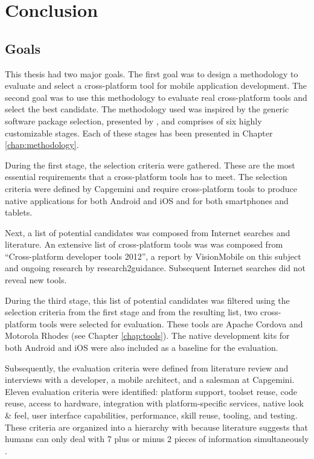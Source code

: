 \chapter{Conclusion}
\label{chap:conclusion}

\section{Goals}
\label{sec:goals}

This thesis had two major goals. The first goal was to design a methodology to evaluate and select a cross-platform tool for mobile application development. The second goal was to use this methodology to evaluate real cross-platform tools and select the best candidate. The methodology used was inspired by the generic software package selection, presented by \citet{Jadhav:2011}, and comprises of six highly customizable stages. Each of these stages has been presented in Chapter \ref{chap:methodology}. 

During the first stage, the selection criteria were gathered. These are the most essential requirements that a cross-platform tools has to meet. The selection criteria were defined by Capgemini and require cross-platform tools to produce native applications for both Android and iOS and for both smartphones and tablets. 

Next, a list of potential candidates was composed from Internet searches and literature. An extensive list of cross-platform tools was was composed from ``Cross-platform developer tools 2012'', a report by VisionMobile on this subject \cite{VMCPT:2012} and ongoing research by research2guidance. Subsequent Internet searches did not reveal new tools.

During the third stage, this list of potential candidates was filtered using the selection criteria from the first stage and from the resulting list, two cross-platform tools were selected for evaluation. These tools are Apache Cordova and Motorola Rhodes (see Chapter \ref{chap:tools}). The native development kits for both Android and iOS were also included as a baseline for the evaluation. 

Subsequently, the evaluation criteria were defined from literature review and interviews with a developer, a mobile architect, and a salesman at Capgemini. Eleven evaluation criteria were identified: platform support, toolset reuse, code reuse, access to hardware, integration with platform-specific services, native look \& feel, user interface capabilities, performance, skill reuse, tooling, and testing. These criteria are organized into a hierarchy with because literature suggests that humans can only deal with 7 plus or minus 2 pieces of information simultaneously \cite{Miller:1956}.

